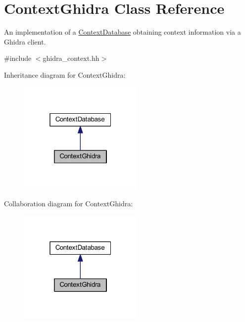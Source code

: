 \hypertarget{class_context_ghidra}{}\section{Context\+Ghidra Class Reference}
\label{class_context_ghidra}


An implementation of a \mbox{\hyperlink{class_context_database}{Context\+Database}} obtaining context information via a Ghidra client.  




{\ttfamily \#include $<$ghidra\+\_\+context.\+hh$>$}



Inheritance diagram for Context\+Ghidra\+:
\nopagebreak
\begin{figure}[H]
\begin{center}
\leavevmode
\includegraphics[width=172pt]{class_context_ghidra__inherit__graph}
\end{center}
\end{figure}


Collaboration diagram for Context\+Ghidra\+:
\nopagebreak
\begin{figure}[H]
\begin{center}
\leavevmode
\includegraphics[width=172pt]{class_context_ghidra__coll__graph}
\end{center}
\end{figure}
